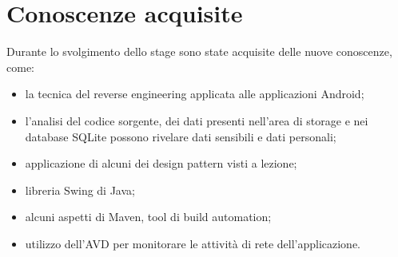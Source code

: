 
\section{Conoscenze acquisite}\label{sec:conoscenze-acquisite}
Durante lo svolgimento dello stage sono state acquisite delle nuove conoscenze, come:
\begin{itemize}\itemsep0em
    \item la tecnica del reverse engineering applicata alle applicazioni Android;
    \item l'analisi del codice sorgente, dei dati presenti nell'area di storage e nei database SQLite possono rivelare dati sensibili e dati personali;
    \item applicazione di alcuni dei design pattern visti a lezione;
    \item libreria Swing di Java;
    \item alcuni aspetti di Maven, tool di build automation;
    \item utilizzo dell'AVD per monitorare le attività di rete dell'applicazione.
\end{itemize}
